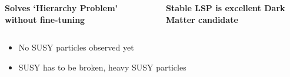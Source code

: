 \documentclass{beamer}
\begin{document}
\begin{frame}
\begin{columns}
\begin{column}{0.5\textwidth}
    \end{column}
  \end{columns}    
  \begin{columns}
    \begin{column}{0.49\textwidth}
      \begin{block}{}
        \centering
        \textbf{Solves `Hierarchy Problem' without fine-tuning}
      \end{block}
    \end{column}
    \begin{column}{0.02\textwidth}
    \end{column}
    \begin{column}{0.49\textwidth}
      \begin{block}{}
        \centering
        \textbf{Stable LSP is excellent Dark Matter candidate\emptybox{11pt}}
      \end{block}
    \end{column}
  \end{columns}  
  \vskip0.5cm
  \begin{itemize}
  \item No SUSY particles observed yet
  \item SUSY has to be broken, heavy SUSY particles
  \end{itemize}
\end{frame}
\end{document}
